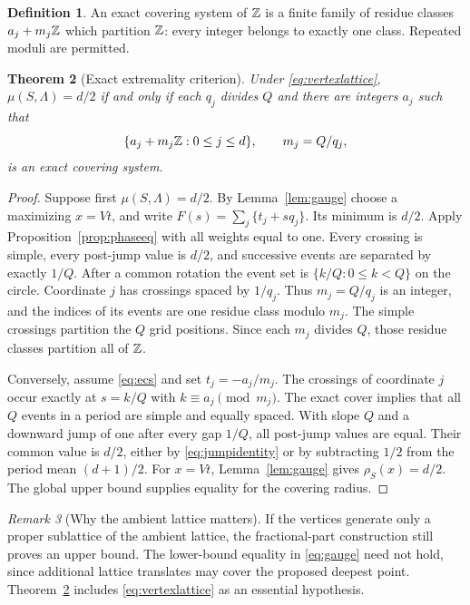 \documentclass[11pt,a4paper]{article}
\newtheorem{theorem}{Theorem}[section]
\theoremstyle{definition}\newtheorem{definition}[theorem]{Definition}
\theoremstyle{remark}\newtheorem{remark}[theorem]{Remark}
\begin{document}
\begin{definition}
An exact covering system of $\mathbb Z$ is a finite family of residue
classes $a_j+m_j\mathbb Z$ which partition $\mathbb Z$: every integer belongs
to exactly one class. Repeated moduli are permitted.
\end{definition}

\begin{theorem}[Exact extremality criterion]\label{thm:ecs}
Under \eqref{eq:vertexlattice}, $\mu(S,\Lambda)=d/2$ if and only
if each $q_j$ divides $Q$ and there are integers $a_j$ such that
\begin{equation}\label{eq:ecs}
 \{a_j+m_j\mathbb Z:0\le j\le d\},\qquad m_j=Q/q_j,
\end{equation}
is an exact covering system.
\end{theorem}
\begin{proof}
Suppose first $\mu(S,\Lambda)=d/2$. By Lemma~\ref{lem:gauge}
choose a maximizing $x=Vt$, and write
$F(s)=\sum_j\{t_j+sq_j\}$. Its minimum is $d/2$.
Apply Proposition~\ref{prop:phaseeq} with all weights equal to one.
Every crossing is simple, every post-jump value is $d/2$, and
successive events are separated by exactly $1/Q$.
After a common rotation the event set is
$\{k/Q:0\le k<Q\}$ on the circle.
Coordinate $j$ has crossings spaced by $1/q_j$. Thus
$m_j=Q/q_j$ is an integer, and the indices of its events are one
residue class modulo $m_j$. The simple crossings partition the
$Q$ grid positions. Since each $m_j$ divides $Q$, those residue
classes partition all of $\mathbb Z$.

Conversely, assume \eqref{eq:ecs} and set $t_j=-a_j/m_j$.
The crossings of coordinate $j$ occur exactly at $s=k/Q$ with
$k\equiv a_j\pmod{m_j}$. The exact cover implies that all $Q$
events in a period are simple and equally spaced. With slope $Q$
and a downward jump of one after every gap $1/Q$, all post-jump
values are equal. Their common value is $d/2$, either by
\eqref{eq:jumpidentity} or by subtracting $1/2$ from the period
mean $(d+1)/2$. For $x=Vt$, Lemma~\ref{lem:gauge} gives
$\rho_S(x)=d/2$. The global upper bound supplies equality for the
covering radius.
\end{proof}

\begin{remark}[Why the ambient lattice matters]
If the vertices generate only a proper sublattice of the ambient
lattice, the fractional-part construction still proves an upper
bound. The lower-bound equality in \eqref{eq:gauge} need not hold,
since additional lattice translates may cover the proposed deepest
point. Theorem~\ref{thm:ecs} includes
\eqref{eq:vertexlattice} as an essential hypothesis.
\end{remark}
\end{document}
